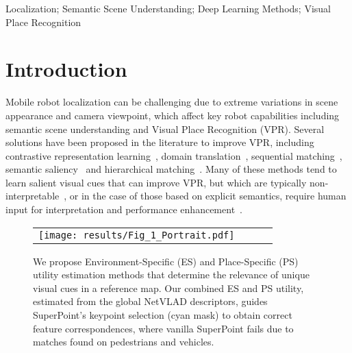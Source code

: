\documentclass[letterpaper, 10 pt, conference]{ieeeconf}  \fi
\begin{document}
\ifralfinal
\begin{IEEEkeywords}
Localization; Semantic Scene Understanding; Deep Learning Methods; Visual Place Recognition
\end{IEEEkeywords}
\fi


\section{Introduction}
\ifralfinal
{}
\else
Mobile
\fi robot localization can be challenging due to extreme variations in scene appearance and camera viewpoint, which affect key robot capabilities including semantic scene understanding and Visual Place Recognition (VPR). Several solutions have been proposed in the literature to improve VPR, including contrastive representation learning~\cite{arandjelovic2016netvlad,revaud2019learning}, domain translation~\cite{latif2018addressing}, sequential matching~\cite{garg2021seqnet,garg2020delta}, semantic saliency~\cite{garg2018lost,naseer2017semantics} and hierarchical matching~\cite{cummins2011appearance,sarlin2019coarse}. Many of these methods tend to learn salient visual cues that can improve VPR, but which are typically non-interpretable~\cite{arandjelovic2016netvlad,detone2018superpoint}, or in the case of those based on explicit semantics, require human input for interpretation and performance enhancement~\cite{garg2018lost,gawel2018x,naseer2017semantics}.

\begin{figure}
\centering
\begin{tabular}{cccc}
\texttt{[image: results/Fig\_1\_Portrait.pdf]} \\
\end{tabular}
\caption{We propose Environment-Specific (ES) and Place-Specific (PS) utility estimation methods that determine the relevance of unique visual cues in a reference map. Our combined ES and PS utility, estimated from the global NetVLAD descriptors, guides SuperPoint's keypoint selection (cyan mask) to obtain correct feature correspondences, where vanilla SuperPoint fails due to matches found on pedestrians and vehicles.}
\label{fig:Overview}
\end{figure}
\end{document}
